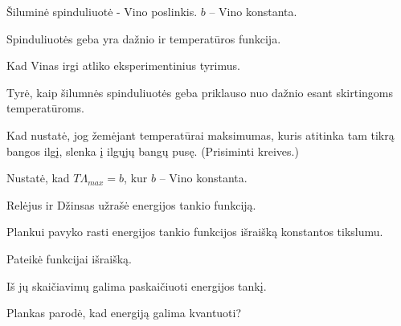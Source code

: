 Šiluminė spinduliuotė - Vino poslinkis. 
$b$ – Vino konstanta.

Spinduliuotės geba yra dažnio ir temperatūros funkcija.

\begin{remember}
  \item Kad Vinas irgi atliko eksperimentinius tyrimus.
  \item Tyrė, kaip šilumnės spinduliuotės geba priklauso nuo dažnio esant
    skirtingoms temperatūroms.
  \item Kad nustatė, jog žemėjant temperatūrai maksimumas, kuris atitinka
    tam tikrą bangos ilgį, slenka į ilgųjų bangų pusę. (Prisiminti
    kreives.)
  \item Nustatė, kad $T\Lambda_{max} = b$, kur $b$ – Vino konstanta.
\end{remember}

Relėjus ir Džinsas užrašė energijos tankio funkciją.

Plankui pavyko rasti energijos tankio funkcijos išraišką konstantos
tikslumu.

\begin{remember}
  \item Pateikė funkcijai išraišką.
  \item Iš jų skaičiavimų galima paskaičiuoti energijos tankį.
  \item Plankas parodė, kad energiją galima kvantuoti?
\end{remember}
